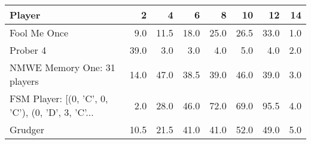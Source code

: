 \begin{tabular}{lrrrrrrr}
\toprule
                                            Player &     2 &     4 &     6 &     8 &    10 &    12 &   14 \\
\midrule
                                      Fool Me Once &   9.0 &  11.5 &  18.0 &  25.0 &  26.5 &  33.0 &  1.0 \\
                                          Prober 4 &  39.0 &   3.0 &   3.0 &   4.0 &   5.0 &   4.0 &  2.0 \\
                       NMWE Memory One: 31 players &  14.0 &  47.0 &  38.5 &  39.0 &  46.0 &  39.0 &  3.0 \\
 FSM Player: [(0, 'C', 0, 'C'), (0, 'D', 3, 'C'... &   2.0 &  28.0 &  46.0 &  72.0 &  69.0 &  95.5 &  4.0 \\
                                           Grudger &  10.5 &  21.5 &  41.0 &  41.0 &  52.0 &  49.0 &  5.0 \\
\bottomrule
\end{tabular}
